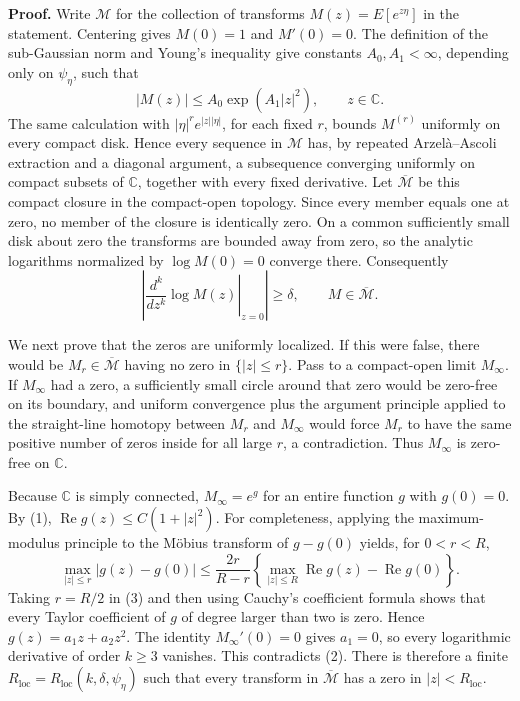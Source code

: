\textbf{Proof.}
Write \(\mathscr M\) for the collection of transforms \(M(z)=E[e^{z\eta}]\) in the statement.  Centering gives \(M(0)=1\) and \(M'(0)=0\).  The definition of the sub-Gaussian norm and Young's inequality give constants \(A_0,A_1<\infty\), depending only on \(\psi_\eta\), such that
\[
 |M(z)|\le A_0\exp(A_1|z|^2),\qquad z\in\mathbb C. \tag{1}
\]
The same calculation with \(|\eta|^r e^{|z||\eta|}\), for each fixed \(r\), bounds \(M^{(r)}\) uniformly on every compact disk.  Hence every sequence in \(\mathscr M\) has, by repeated Arzel\`a--Ascoli extraction and a diagonal argument, a subsequence converging uniformly on compact subsets of \(\mathbb C\), together with every fixed derivative.  Let \(\overline{\mathscr M}\) be this compact closure in the compact-open topology.  Since every member equals one at zero, no member of the closure is identically zero.  On a common sufficiently small disk about zero the transforms are bounded away from zero, so the analytic logarithms normalized by \(\log M(0)=0\) converge there.  Consequently
\[
 \left|\left.\frac{d^k}{dz^k}\log M(z)\right|_{z=0}\right|\ge\delta,
 \qquad M\in\overline{\mathscr M}. \tag{2}
\]

We next prove that the zeros are uniformly localized.  If this were false, there would be \(M_r\in\overline{\mathscr M}\) having no zero in \(\{|z|\le r\}\).  Pass to a compact-open limit \(M_\infty\).  If \(M_\infty\) had a zero, a sufficiently small circle around that zero would be zero-free on its boundary, and uniform convergence plus the argument principle applied to the straight-line homotopy between \(M_r\) and \(M_\infty\) would force \(M_r\) to have the same positive number of zeros inside for all large \(r\), a contradiction.  Thus \(M_\infty\) is zero-free on \(\mathbb C\).

Because \(\mathbb C\) is simply connected, \(M_\infty=e^g\) for an entire function \(g\) with \(g(0)=0\).  By (1), \(\operatorname{Re}g(z)\le C(1+|z|^2)\).  For completeness, applying the maximum-modulus principle to the M\"obius transform of \(g-g(0)\) yields, for \(0<r<R\),
\[
 \max_{|z|\le r}|g(z)-g(0)|
 \le \frac{2r}{R-r}
 \left\{\max_{|z|\le R}\operatorname{Re}g(z)-\operatorname{Re}g(0)\right\}. \tag{3}
\]
Taking \(r=R/2\) in (3) and then using Cauchy's coefficient formula shows that every Taylor coefficient of \(g\) of degree larger than two is zero.  Hence \(g(z)=a_1z+a_2z^2\).  The identity \(M_\infty'(0)=0\) gives \(a_1=0\), so every logarithmic derivative of order \(k\ge3\) vanishes.  This contradicts (2).  There is therefore a finite \(R_{\mathrm{loc}}=R_{\mathrm{loc}}(k,\delta,\psi_\eta)\) such that every transform in \(\overline{\mathscr M}\) has a zero in \(|z|<R_{\mathrm{loc}}\).

